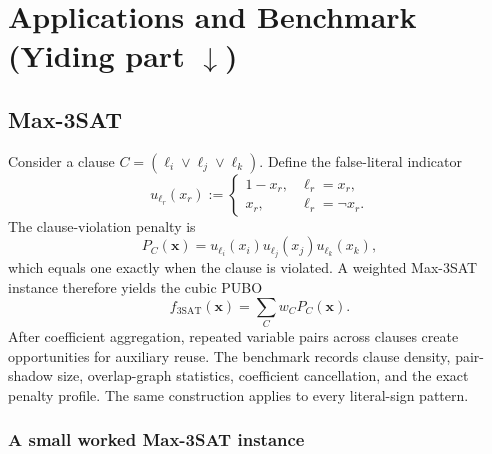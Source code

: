 \documentclass[a4paper,onecolumn,11pt,unpublished]{quantumarticle}
\theoremstyle{remark}
\begin{document}
\section{Applications and Benchmark (Yiding part \(\downarrow\))}
\label{sec:applications}
\subsection{Max-3SAT}

Consider a clause $C=(\ell_i\lor\ell_j\lor\ell_k)$. Define the false-literal indicator
\begin{equation}
    u_{\ell_r}(x_r)
    :=\begin{cases}
       1-x_r, & \ell_r=x_r,\\
       x_r, & \ell_r=\neg x_r.
    \end{cases}
    \label{eq:false-indicator}
\end{equation}
The clause-violation penalty is
\begin{equation}
    P_C(\bm x)=u_{\ell_i}(x_i)u_{\ell_j}(x_j)u_{\ell_k}(x_k),
    \label{eq:clause-penalty}
\end{equation}
which equals one exactly when the clause is violated. A weighted Max-3SAT
instance therefore yields the cubic PUBO~\cite{Nagies2025,Nusslein2023}
\begin{equation}
    f_{\mathrm{3SAT}}(\bm x)=\sum_{C}w_CP_C(\bm x).
    \label{eq:max3sat-pubo}
\end{equation}
After coefficient aggregation, repeated variable pairs across clauses create opportunities for auxiliary reuse. The benchmark records clause density, pair-shadow size, overlap-graph statistics, coefficient cancellation, and the exact penalty profile. The same construction applies to every literal-sign pattern.

\subsubsection{A small worked Max-3SAT instance}
\label{sec:max3sat-worked-example}
\end{document}
